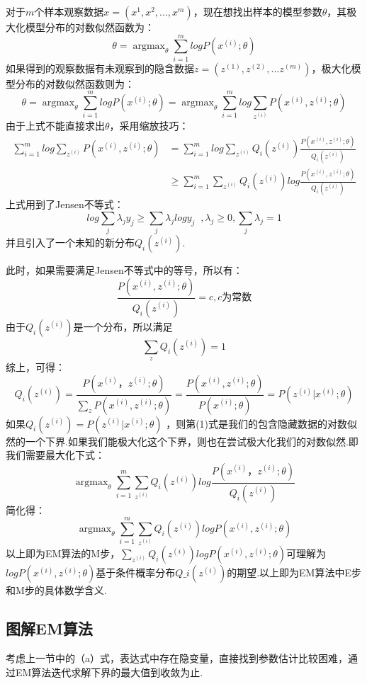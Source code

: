 ​
对于$m$个样本观察数据$x=(x^{1},x^{2},...,x^{m})$，现在想找出样本的模型参数$\theta$，其极大化模型分布的对数似然函数为：
\[
\theta = \mathop{\arg\max}_\theta\sum\limits_{i=1}^m logP(x^{(i)};\theta)
\]
如果得到的观察数据有未观察到的隐含数据$z=(z^{(1)},z^{(2)},...z^{(m)})$，极大化模型分布的对数似然函数则为：
\[
\theta =\mathop{\arg\max}_\theta\sum\limits_{i=1}^m logP(x^{(i)};\theta) = \mathop{\arg\max}_\theta\sum\limits_{i=1}^m log\sum\limits_{z^{(i)}}P(x^{(i)}, z^{(i)};\theta)  \tag{a}
\] 由于上式不能直接求出$\theta$，采用缩放技巧： \[
\begin{align} \sum\limits_{i=1}^m log\sum\limits_{z^{(i)}}P(x^{(i)}, z^{(i)};\theta)   & = \sum\limits_{i=1}^m log\sum\limits_{z^{(i)}}Q_i(z^{(i)})\frac{P(x^{(i)}, z^{(i)};\theta)}{Q_i(z^{(i)})} \\ & \geqslant  \sum\limits_{i=1}^m \sum\limits_{z^{(i)}}Q_i(z^{(i)})log\frac{P(x^{(i)}, z^{(i)};\theta)}{Q_i(z^{(i)})} \end{align}   \tag{1}
\] 上式用到了Jensen不等式： \[
log\sum\limits_j\lambda_jy_j \geqslant \sum\limits_j\lambda_jlogy_j\;\;,  \lambda_j \geqslant 0, \sum\limits_j\lambda_j =1
\] 并且引入了一个未知的新分布$Q_i(z^{(i)})$.

此时，如果需要满足Jensen不等式中的等号，所以有： \[
\frac{P(x^{(i)}, z^{(i)};\theta)}{Q_i(z^{(i)})} =c, c为常数
\] 由于$Q_i(z^{(i)})$是一个分布，所以满足 \[
\sum\limits_{z}Q_i(z^{(i)}) =1
\] 综上，可得： \[
Q_i(z^{(i)})  = \frac{P(x^{(i)}， z^{(i)};\theta)}{\sum\limits_{z}P(x^{(i)}, z^{(i)};\theta)} =  \frac{P(x^{(i)}, z^{(i)};\theta)}{P(x^{(i)};\theta)} = P( z^{(i)}|x^{(i)};\theta)
\] 如果$Q_i(z^{(i)}) = P( z^{(i)}|x^{(i)};\theta)$
，则第(1)式是我们的包含隐藏数据的对数似然的一个下界.如果我们能极大化这个下界，则也在尝试极大化我们的对数似然.即我们需要最大化下式：
\[
\mathop{\arg\max}_\theta \sum\limits_{i=1}^m \sum\limits_{z^{(i)}}Q_i(z^{(i)})log\frac{P(x^{(i)}， z^{(i)};\theta)}{Q_i(z^{(i)})}
\] 简化得： \[
\mathop{\arg\max}_\theta \sum\limits_{i=1}^m \sum\limits_{z^{(i)}}Q_i(z^{(i)})log{P(x^{(i)}, z^{(i)};\theta)}
\]
以上即为EM算法的M步，$\sum\limits_{z^{(i)}}Q_i(z^{(i)})log{P(x^{(i)}, z^{(i)};\theta)}​$可理解为$logP(x^{(i)},
z^{(i)};\theta) $基于条件概率分布$Q\_i(z^{(i)})
$的期望.以上即为EM算法中E步和M步的具体数学含义.

\subsection{ 图解EM算法}\label{ux56feux89e3emux7b97ux6cd5}

​
考虑上一节中的（a）式，表达式中存在隐变量，直接找到参数估计比较困难，通过EM算法迭代求解下界的最大值到收敛为止.

